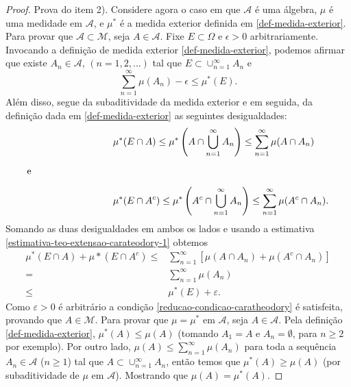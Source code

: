 \begin{proof}
Prova do item 2). Considere agora o caso em que $ \mathcal{A}$ é uma álgebra, $\mu$ é uma 
medidade em $ \mathcal{A} $, e $ \mu^* $ é a medida exterior definida em \eqref{def-medida-exterior}.
Para provar que $ \mathcal{A} \subset \mathcal{M} $, seja $ A \in \mathcal{A} $. Fixe 
$E \subset \Omega $ e $ \epsilon > 0 $ arbitrariamente. 
Invocando a definição de medida exterior \eqref{def-medida-exterior}, 
podemos afirmar que existe $ A_n \in \mathcal{A}$, 
$(n =1, 2 , \dots)$ tal que $ E \subset \cup_{n=1}^{\infty} A_n $ e 
\begin{equation}\label{estimativa-teo-extensao-carateodory-1}
  \sum_{n=1}^{\infty} \mu(A_n)-\epsilon \leq \mu^*(E).
\end{equation}
Além disso, segue da subaditividade da medida exterior e em seguida, 
da definição dada em \eqref{def-medida-exterior} as seguintes desigualdades: 
\begin{align*}
    &\mu^*(E \cap A)  \le \mu^*\left( A \cap \bigcup_{n=1}^{\infty} A_n\right) 
                      \le \sum_{n=1}^{\infty}\mu(A \cap  A_n)
     \\[0.2cm]
     \text{e} \hspace*{3cm}&
     \\[0.2cm]
     &\mu^*(E \cap A^c)  \le \mu^*\left(A^c \cap \bigcup_{n=1}^{\infty} A_n\right) 
                                \le \sum_{n=1}^{\infty}\mu(A^c \cap  A_n).
\end{align*}
Somando as duas desigualdades em ambos os lados e 
usando a estimativa \eqref{estimativa-teo-extensao-carateodory-1}
obtemos 
\begin{align*}
     \mu^*(E \cap A)+ \mu*(E \cap A^c)
     \le& 
     \sum_{n=1}^{\infty}[\mu(A \cap  A_n) +  \mu(A^c \cap  A_n)]
     \\[0.2cm]
     =& 
     \sum_{n=1}^{\infty}\mu(A_n) 
     \\[0.2cm]
     \leq&
     \mu^*(E)+\varepsilon.
\end{align*}
Como $\varepsilon>0$ é arbitrário a condição \eqref{reducao-condicao-caratheodory} 
é satisfeita, provando que $ A \in \mathcal{M}$. 
Para provar que $ \mu = \mu^* $ em $ \mathcal{A} $, seja $ A \in \mathcal{A}$. Pela definição 
\eqref{def-medida-exterior}, $ \mu^*(A) \le \mu(A) $ (tomando $ A_1 = A $ e $ A_n = \emptyset $,
para $ n \ge 2 $ por exemplo). Por outro lado, $ \mu(A) \le \sum_{n=1}^{\infty} \mu(A_n)  $ para toda
a sequência $ A_n \in \mathcal{A} $ ($  n \ge 1$) tal que $ A \subset \cup_{n=1}^{\infty} A_n $, então
temos que  $ \mu^*(A) \ge \mu(A) $ (por subaditividade de $\mu$ em $ \mathcal{A} $).
Mostrando que $ \mu(A) = \mu^*(A)$.


\end{proof}

